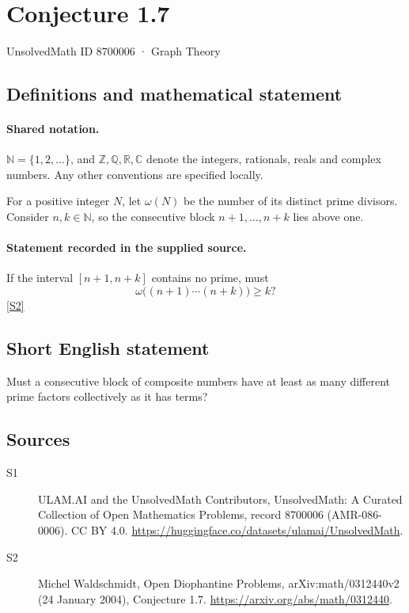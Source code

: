 \documentclass[11pt]{article}
\newcommand{\sref}[2]{\hyperlink{source:#1:#2}{[S#2]}}
\begin{document}
\setcounter{section}{8700005}
\section{Conjecture 1.7}\label{8700006}
{\small\sffamily UnsolvedMath ID 8700006 · Graph Theory}
\subsection{Definitions and mathematical statement}

\paragraph{Shared notation.}$\mathbb N=\{1,2,\ldots\}$, and $\mathbb Z,\mathbb Q,\mathbb R,\mathbb C$ denote the integers, rationals, reals and complex numbers. Any other conventions are specified locally.


For a positive integer $N$, let $\omega(N)$ be the number of its distinct prime divisors. Consider $n,k\in\mathbb N$, so the consecutive block $n+1,\ldots,n+k$ lies above one.
\paragraph{Statement recorded in the supplied source.}
If the interval $[n+1,n+k]$ contains no prime, must \[\omega\bigl((n+1)\cdots(n+k)\bigr)\ge k?\] \sref{8700006}{2}
\subsection{Short English statement}
Must a consecutive block of composite numbers have at least as many different prime factors collectively as it has terms?
\subsection{Sources}
\begin{description}
\item[\hypertarget{source:8700006:1}{S1}] ULAM.AI and the UnsolvedMath Contributors, UnsolvedMath: A Curated Collection of Open Mathematics Problems, record 8700006 (AMR-086-0006). CC BY 4.0. \url{https://huggingface.co/datasets/ulamai/UnsolvedMath}.
\item[\hypertarget{source:8700006:2}{S2}] Michel Waldschmidt, Open Diophantine Problems, arXiv:math/0312440v2 (24 January 2004), Conjecture 1.7. \url{https://arxiv.org/abs/math/0312440}.
\end{description}
\label{end:8700006}
\end{document}
